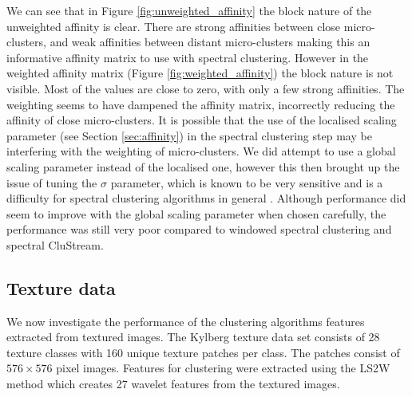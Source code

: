 We can see that in Figure \ref{fig:unweighted_affinity} the block nature of the unweighted affinity is clear. There are strong affinities between close micro-clusters, and weak affinities between distant micro-clusters making this an informative affinity matrix to use with spectral clustering. However in the weighted affinity matrix (Figure \ref{fig:weighted_affinity}) the block nature is not visible. Most of the values are close to zero, with only a few strong affinities. The weighting seems to have dampened the affinity matrix, incorrectly reducing the affinity of  close micro-clusters. It is possible that the use of the localised scaling parameter (see Section \ref{sec:affinity}) in the spectral clustering step may be interfering with the weighting of micro-clusters.  We did attempt to use a global scaling parameter instead of the localised one, however this then brought up the issue of tuning the $\sigma$ parameter, which is known to be very sensitive and is a difficulty for spectral clustering algorithms in general \citep{Luxburg2008}. Although performance did seem to improve with the global scaling parameter when chosen carefully, the performance was still very poor compared to windowed spectral clustering and spectral CluStream.


\subsection{Texture data}

We now investigate the performance of the clustering algorithms features extracted from textured images. The Kylberg  texture data set \citep{kylberg2011c} consists of 28 texture classes with 160 unique texture patches per class. The patches consist of $576 \times 576$ pixel images. Features for clustering were extracted using the LS2W method \citep{Eckley2011} which creates 27 wavelet features from the textured images. 

